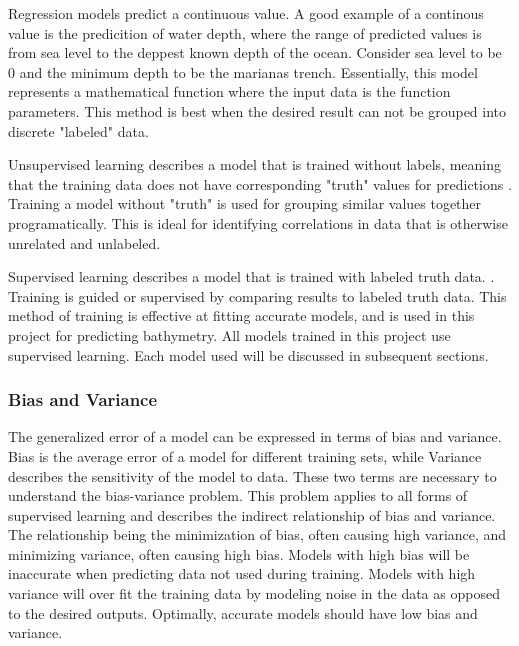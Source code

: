 \par
Regression models predict a continuous value.
A good example of a continous value is the predicition of water depth, where the range of predicted values is from sea level to the deppest known depth of the ocean.
Consider sea level to be 0 and the minimum depth to be the marianas trench.
Essentially, this model represents a mathematical function where the input data is the function parameters.
This method is best when the desired result can not be grouped into discrete "labeled" data.

\par
Unsupervised learning describes a model that is trained without labels, meaning that the training data does not have corresponding "truth" values for predictions \cite{bishop2006pattern}.
Training a model without "truth" is used for grouping similar values together programatically.
This is ideal for identifying correlations in data that is otherwise unrelated and unlabeled.

\par
Supervised learning describes a model that is trained with labeled truth data. \cite{bishop2006pattern}.
Training is guided or supervised by comparing results to labeled truth data.
This method of training is effective at fitting accurate models, and is used in this project for predicting bathymetry.
All models trained in this project use supervised learning.
Each model used will be discussed in subsequent sections.

\subsubsection{Bias and Variance}
The generalized error of a model can be expressed in terms of bias and variance.
Bias is the average error of a model for different training sets, while Variance describes the sensitivity of the model to data.
These two terms are necessary to understand the bias-variance problem.
This problem applies to all forms of supervised learning \cite{geman1992neural} and describes the indirect relationship of bias and variance.
The relationship being the minimization of bias, often causing high variance, and minimizing variance, often causing high bias.
Models with high bias will be inaccurate when predicting data not used during training.
Models with high variance will over fit \cite{cawley2010over} the training data by modeling noise in the data as opposed to the desired outputs.
Optimally, accurate models should have low bias and variance.


